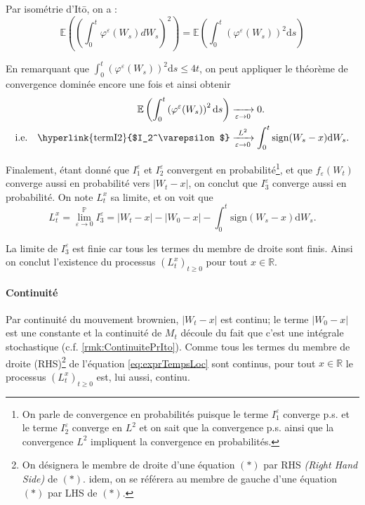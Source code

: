 \documentclass[openany]{book}
\makeatletter
\renewcommand{\P}{\mathds{P}}
\newcommand{\R}{\mathbb{R}}
\newcommand{\E}{\mathbb{E}}
\newcommand{\1}{\mathbbm{1}}
\newcommand{\sign}{\text{sign}}
\renewcommand{\d}{\mathrm{d}}
\renewenvironment{proof}[1][\textbf{\textit{Démonstration}}]{%
  \par\pushQED{\qed}%
  \normalfont\topsep6\p@\@plus6\p@\relax
  \trivlist\item[\hskip\labelsep
    #1\@addpunct{.}]\ignorespaces
}{%
  \popQED\endtrivlist\@endpefalse
}
\theoremstyle{thmfont}
\theoremstyle{deffont}
\theoremstyle{thmfont}
\theoremstyle{deffont}
\makeatother
\begin{document}
\begin{proof}
\noindent Par isométrie d'Itō, on a :
$$\E\left(\left(\int_0^t \varphi^\varepsilon(W_s) dW_s\right)^2\right) = \E\left(\int_0^t\left(\varphi^\varepsilon(W_s)\right)^2\d s\right)$$

\noindent En remarquant que $\int_0^t \left(\varphi^\varepsilon(W_s)\right)^2\d s \leq 4t$, on peut appliquer le théorème de convergence dominée encore une fois et ainsi obtenir
\begin{align*}
  \E\left(\int_0^t\left(\varphi^\varepsilon(W_s)\right)^2\d s\right) &\xrightarrow[\varepsilon\to0]{} 0.\\
  \text{i.e.}\quad\text{\hyperlink{termI2}{$I_2^\varepsilon$}} &\xrightarrow[\varepsilon\to0]{L^2} \int_0^t \sign(W_s - x) \d W_s.
\end{align*}


\noindent Finalement, étant donné que \hyperlink{termI1}{$I_1^\varepsilon$} et \hyperlink{termI2}{$I_2^\varepsilon$} convergent en probabilité\footnote{On parle de convergence en probabilités puisque le terme \hyperlink{termI1}{$I_1^\varepsilon$} converge p.s. et le terme \hyperlink{termI2}{$I_2^\varepsilon$} converge en $L^2$ et on sait que la convergence p.s. ainsi que la convergence $L^2$ impliquent la convergence en probabilités.}, et que $f_\varepsilon(W_t)$ converge aussi en probabilité vers $|W_t - x|$, on conclut que \hyperlink{termI3}{$I_3^\varepsilon$} converge aussi en probabilité. On note $L_t^x$ sa limite, et on voit que
\begin{equation}
  L_t^x = \lim_{\varepsilon \to 0}^{\P}I_3^\varepsilon = |W_t-x| - |W_0 - x| -  \int_0^t\sign(W_s -x)\d W_s.
  \label{eq:exprTempsLoc}
\end{equation}

\noindent La limite de \hyperlink{termI3}{$I_3^\varepsilon$} est finie car tous les termes du membre de droite sont finis. Ainsi on conclut l'existence du processus $(L_t^x)_{t\geq0}$ pour tout $x \in \R$.

\paragraph{Continuité} Par continuité du mouvement brownien, $|W_t - x|$ est continu; le terme $|W_0 - x|$ est une constante et la continuité de $M_t$ découle du fait que c'est une intégrale stochastique (c.f. \autoref{rmk:ContinuitePrIto}).
Comme tous les termes du membre de droite (RHS)\footnote{On désignera le membre de droite d'une équation $(*)$ par RHS \textit{(Right Hand Side)} de $(*)$. idem, on se référera au membre de gauche d'une équation $(*)$ par LHS de $(*)$.} de l'équation \eqref{eq:exprTempsLoc} sont continus, pour tout $x \in \R$ le processus $(L_t^x)_{t\geq0}$ est, lui aussi, continu.


\end{proof}
\end{document}
